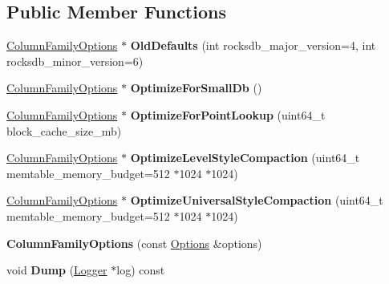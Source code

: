 \subsection*{Public Member Functions}
\begin{DoxyCompactItemize}
\item 
\hyperlink{structrocksdb_1_1ColumnFamilyOptions}{Column\+Family\+Options} $\ast$ {\bfseries Old\+Defaults} (int rocksdb\+\_\+major\+\_\+version=4, int rocksdb\+\_\+minor\+\_\+version=6)\hypertarget{structrocksdb_1_1ColumnFamilyOptions_a7aa3ad0f7ac155931046d0c4bc6a04b6}{}\label{structrocksdb_1_1ColumnFamilyOptions_a7aa3ad0f7ac155931046d0c4bc6a04b6}

\item 
\hyperlink{structrocksdb_1_1ColumnFamilyOptions}{Column\+Family\+Options} $\ast$ {\bfseries Optimize\+For\+Small\+Db} ()\hypertarget{structrocksdb_1_1ColumnFamilyOptions_ad82804c03166c2cca3689daa36da8349}{}\label{structrocksdb_1_1ColumnFamilyOptions_ad82804c03166c2cca3689daa36da8349}

\item 
\hyperlink{structrocksdb_1_1ColumnFamilyOptions}{Column\+Family\+Options} $\ast$ {\bfseries Optimize\+For\+Point\+Lookup} (uint64\+\_\+t block\+\_\+cache\+\_\+size\+\_\+mb)\hypertarget{structrocksdb_1_1ColumnFamilyOptions_aa7608dfefb814f5df10389227f1b0293}{}\label{structrocksdb_1_1ColumnFamilyOptions_aa7608dfefb814f5df10389227f1b0293}

\item 
\hyperlink{structrocksdb_1_1ColumnFamilyOptions}{Column\+Family\+Options} $\ast$ {\bfseries Optimize\+Level\+Style\+Compaction} (uint64\+\_\+t memtable\+\_\+memory\+\_\+budget=512 $\ast$1024 $\ast$1024)\hypertarget{structrocksdb_1_1ColumnFamilyOptions_a4fe010cb8ce0a7accbce36c68c42c7ff}{}\label{structrocksdb_1_1ColumnFamilyOptions_a4fe010cb8ce0a7accbce36c68c42c7ff}

\item 
\hyperlink{structrocksdb_1_1ColumnFamilyOptions}{Column\+Family\+Options} $\ast$ {\bfseries Optimize\+Universal\+Style\+Compaction} (uint64\+\_\+t memtable\+\_\+memory\+\_\+budget=512 $\ast$1024 $\ast$1024)\hypertarget{structrocksdb_1_1ColumnFamilyOptions_a863f08e956f230c203a461a5bd80674e}{}\label{structrocksdb_1_1ColumnFamilyOptions_a863f08e956f230c203a461a5bd80674e}

\item 
{\bfseries Column\+Family\+Options} (const \hyperlink{structrocksdb_1_1Options}{Options} \&options)\hypertarget{structrocksdb_1_1ColumnFamilyOptions_a821f33ce0d7f9a5e5ca9264ca96d4d72}{}\label{structrocksdb_1_1ColumnFamilyOptions_a821f33ce0d7f9a5e5ca9264ca96d4d72}

\item 
void {\bfseries Dump} (\hyperlink{classrocksdb_1_1Logger}{Logger} $\ast$log) const\hypertarget{structrocksdb_1_1ColumnFamilyOptions_ae509bbb7e8710a99d1b8b8443d3ae440}{}\label{structrocksdb_1_1ColumnFamilyOptions_ae509bbb7e8710a99d1b8b8443d3ae440}

\end{DoxyCompactItemize}
